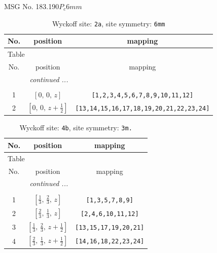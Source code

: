 \documentclass[fleqn,8pt]{jsarticle}
\begin{document}
\setcounter{MaxMatrixCols}{32}

\renewcommand{\tablename}{Table~}
\renewcommand{\figurename}{Figure~}
\begin{center}
\LARGE
MSG No. 183.190\quad$P_{c}6mm$
\end{center}
\renewcommand{\arraystretch}{1.2}
\begin{longtable}{ccc}
\caption{Wyckoff site: {\tt 2a}, site symmetry: {\tt 6mm}}
 \\
 \hline \hline
No. & position & mapping \\ \hline \endfirsthead

\multicolumn{2}{l}{\tablename\ \thetable{}} \\
 \hline \hline
No. & position & mapping \\ \hline \endhead

 \hline \hline
\multicolumn{2}{r}{\footnotesize\it continued ...} \\ \endfoot

 \hline \hline
\multicolumn{2}{r}{} \\ \endlastfoot

1 & $\left[ 0,\, 0,\, z \right]$ & {\tt [1,2,3,4,5,6,7,8,9,10,11,12]} \\ \hline
2 & $\left[ 0,\, 0,\, z + \frac{1}{2} \right]$ & {\tt [13,14,15,16,17,18,19,20,21,22,23,24]} \\
\end{longtable}
\renewcommand{\arraystretch}{1.2}
\begin{longtable}{ccc}
\caption{Wyckoff site: {\tt 4b}, site symmetry: {\tt 3m.}}
 \\
 \hline \hline
No. & position & mapping \\ \hline \endfirsthead

\multicolumn{2}{l}{\tablename\ \thetable{}} \\
 \hline \hline
No. & position & mapping \\ \hline \endhead

 \hline \hline
\multicolumn{2}{r}{\footnotesize\it continued ...} \\ \endfoot

 \hline \hline
\multicolumn{2}{r}{} \\ \endlastfoot

1 & $\left[ \frac{1}{3},\, \frac{2}{3},\, z \right]$ & {\tt [1,3,5,7,8,9]} \\ \hline
2 & $\left[ \frac{2}{3},\, \frac{1}{3},\, z \right]$ & {\tt [2,4,6,10,11,12]} \\ \hline
3 & $\left[ \frac{1}{3},\, \frac{2}{3},\, z + \frac{1}{2} \right]$ & {\tt [13,15,17,19,20,21]} \\ \hline
4 & $\left[ \frac{2}{3},\, \frac{1}{3},\, z + \frac{1}{2} \right]$ & {\tt [14,16,18,22,23,24]} \\
\end{longtable}
\end{document}
